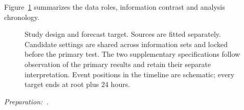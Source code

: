 Figure~\ref{fig:design} summarizes the data roles, information contrast and analysis chronology.

\begin{figure}[t]\centering
\resizebox{\textwidth}{!}{}
\caption{Study design and forecast target. Sources are fitted separately. Candidate settings are shared across information sets and locked before the primary test. The two supplementary specifications follow observation of the primary results and retain their separate interpretation. Event positions in the timeline are schematic; every target ends at root plus 24 hours.}\label{fig:design}\end{figure} {\small\textit{Preparation:~\cite{openai2026}.}}
